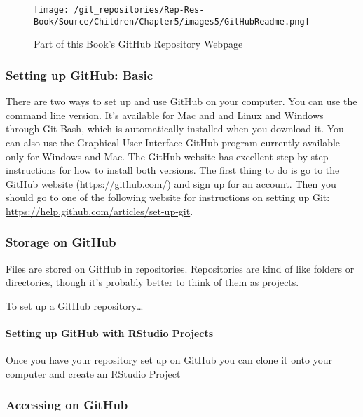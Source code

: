 \begin{figure}[t]
    \caption{Part of this Book's GitHub Repository Webpage}
    \label{BookRepository}
    \begin{center}
    \texttt{[image: /git\_repositories/Rep-Res-Book/Source/Children/Chapter5/images5/GitHubReadme.png]}
    \end{center}
\end{figure}

\subsubsection{Setting up GitHub: Basic}

There are two ways to set up and use GitHub on your computer. You can use the command line version. It's available for Mac and and Linux and Windows through Git Bash, which is automatically installed when you download it. You can also use the Graphical User Interface GitHub program currently available only for Windows and Mac. The GitHub website has excellent step-by-step instructions for how to install both versions. The first thing to do is go to the GitHub website (\url{https://github.com/}) and sign up for an account. Then you should go to one of the following website for instructions on setting up Git: \url{https://help.github.com/articles/set-up-git}.



\subsubsection{Storage on GitHub}

Files are stored on GitHub in repositories. Repositories are kind of like folders or directories, though it's probably better to think of them as projects.

To set up a GitHub repository\ldots

\paragraph{Setting up GitHub with RStudio Projects}

Once you have your repository set up on GitHub you can clone it onto your computer and create an RStudio Project

\subsubsection{Accessing on GitHub}


